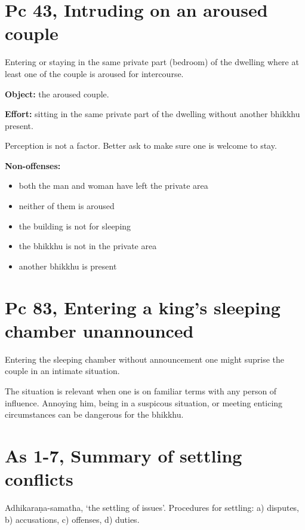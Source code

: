 \section{Pc 43, Intruding on an aroused couple}

\begin{multicols}{2}

Entering or staying in the same private part (bedroom) of the dwelling
where at least one of the couple is aroused for intercourse.

\textbf{Object:} the aroused couple.

\textbf{Effort:} sitting in the same private part of the dwelling
without another bhikkhu present.

Perception is not a factor. Better ask to make sure one is welcome to
stay.

\columnbreak

\textbf{Non-offenses:}

\begin{itemize}
\tightlist
\item
  both the man and woman have left the private area
\item
  neither of them is aroused
\item
  the building is not for sleeping
\item
  the bhikkhu is not in the private area
\item
  another bhikkhu is present
\end{itemize}

\end{multicols}

\section{Pc 83, Entering a king's sleeping chamber unannounced}

Entering the sleeping chamber without announcement one might suprise the
couple in an intimate situation.

The situation is relevant when one is on familiar terms with any person
of influence. Annoying him, being in a suspicous situation, or meeting
enticing circumstances can be dangerous for the bhikkhu.

\section{As 1-7, Summary of settling conflicts}

Adhikaraṇa-samatha, `the settling of issues'. Procedures for settling:
a) disputes, b) accusations, c) offenses, d) duties.


